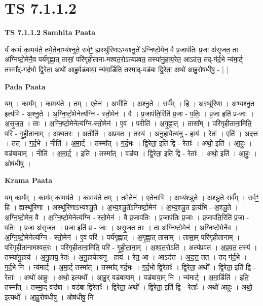 \documentclass[17pt]{extarticle}
\begin{document}
\section{ TS 7.1.1.2 }

\textbf{TS 7.1.1.2 } \newline
\textbf{Samhita Paata} \newline

र्यं कामं॑ का॒मय॑ते॒ तमे॒तेना॒भ्य॑श्नुते॒ सर्वꣳ॒॒ ह्यस्थु॑रिणाऽभ्यश्नु॒ते᳚ ऽग्निष्टो॒मेन॒ वै प्र॒जाप॑तिः प्र॒जा अ॑सृजत॒ ता अ॑ग्निष्टो॒मेनै॒व पर्य॑गृह्णा॒त् तासां॒ परि॑गृहीताना-मश्वत॒रोऽत्य॑प्रवत॒ तस्या॑नु॒हाय॒रेत॒ आऽद॑त्त॒ तद्-ग॑र्द॒भे न्य॑मा॒र्ट् तस्मा᳚द्-गर्द॒भो द्वि॒रेता॒ अथो॑ आहु॒र्वड॑बायां॒ न्य॑मा॒र्डिति॒ तस्मा॒द्-वड॑बा द्वि॒रेता॒ अथो॑ आहु॒रोष॑धीषु॒ - [  ] \newline

\textbf{Pada Paata} \newline

यम् । काम᳚म् । का॒मय॑ते । तम् । ए॒तेन॑ । अ॒भीति॑ । अ॒श्नु॒ते॒ । सर्व᳚म् । हि । अस्थू॑रिणा । अ॒भ्य॒श्नु॒त इत्य॑भि - अ॒श्नु॒ते । अ॒ग्नि॒ष्टो॒मेनेत्य॑ग्नि - स्तो॒मेन॑ । वै । प्र॒जाप॑ति॒रिति॑ प्र॒जा - प॒तिः॒ । प्र॒जा इति॑ प्र-जाः । अ॒सृ॒ज॒त॒ । ताः । अ॒ग्नि॒ष्टो॒मेनेत्य॑ग्नि-स्तो॒मेन॑ । ए॒व । परीति॑ । अ॒गृ॒ह्णा॒त् । तासा᳚म् । परि॑गृहीताना॒मिति॒ परि॑ - गृ॒ही॒ता॒ना॒म् । अ॒श्व॒त॒रः । अतीति॑ । अ॒प्र॒व॒त॒ । तस्य॑ । अ॒नु॒हायेत्य॑नु - हाय॑ । रेतः॑ । एति॑ । अ॒द॒त्त॒ । तत् । ग॒र्द॒भे । नीति॑ । अ॒मा॒र्ट् । तस्मा᳚त् । ग॒र्द॒भः । द्वि॒रेता॒ इति॑ द्वि - रेताः᳚ । अथो॒ इति॑ । आ॒हुः॒ । वड॑बायाम् । नीति॑ । अ॒मा॒र्ट्॒ । इति॑ । तस्मा᳚त् । वड॑बा । द्वि॒रेता॒ इति॑ द्वि - रेताः᳚ । अथो॒ इति॑ । आ॒हुः॒ । ओष॑धीषु ।  \newline


\textbf{Krama Paata} \newline

यम् काम᳚म् । काम॑म् का॒मय॑ते । का॒मय॑ते॒ तम् । तमे॒तेन॑ । ए॒तेना॒भि । अ॒भ्य॑श्ञुते । अ॒श्ञु॒ते॒ सर्व᳚म् । सर्वꣳ॒॒ हि । ह्यस्थू॑रिणा । अस्थू॑रिणाऽभ्यश्ञु॒ते । अ॒भ्य॒श्ञु॒ते᳚ऽग्निष्टो॒मेन॑ । अ॒भ्य॒श्ञु॒त इत्य॑भि - अ॒श्ञु॒ते । अ॒ग्नि॒ष्टो॒मेन॒ वै । अ॒ग्नि॒ष्टो॒मेनेत्य॑ग्नि - स्तो॒मेन॑ । वै प्र॒जाप॑तिः । प्र॒जाप॑तिः प्र॒जाः । प्र॒जाप॑ति॒रिति॑ प्र॒जा - प॒तिः॒ । प्र॒जा अ॑सृजत । प्र॒जा इति॑ प्र - जाः । अ॒सृ॒ज॒त॒ ताः । ता अ॑ग्निष्टो॒मेन॑ । अ॒ग्नि॒ष्टो॒मेनै॒व । अ॒ग्नि॒ष्टो॒मेनेत्य॑ग्नि - स्तो॒मेन॑ । ए॒व परि॑ । पर्य॑गृह्णात् । अ॒गृ॒ह्णा॒त् तासा᳚म् । तासा॒म् परि॑गृहीतानाम् । परि॑गृहीतानामश्वत॒रः । परि॑गृहीताना॒मिति॒ परि॑ - गृ॒ही॒ता॒ना॒म् । अ॒श्व॒त॒रोऽति॑ । अत्य॑प्रवत । अ॒प्र॒व॒त॒ तस्य॑ । तस्या॑नु॒हाय॑ । अ॒नु॒हाय॒ रेतः॑ । अ॒नु॒हायेत्य॑नु - हाय॑ । रेत॒ आ । आऽद॑त्त । अ॒द॒त्त॒ तत् । तद् ग॑र्द॒भे । ग॒र्द॒भे नि । न्य॑मार्ट् । अ॒मा॒र्ट् तस्मा᳚त् । तस्मा᳚द् गर्द॒भः । ग॒र्द॒भो द्वि॒रेताः᳚ । द्वि॒रेता॒ अथो᳚ । द्वि॒रेता॒ इति॑ द्वि - रेताः᳚ । अथो॑ आहुः । अथो॒ इत्यथो᳚ । आ॒हु॒र् वड॑बायाम् । वड॑बाया॒म् नि । न्य॑मार्ट् । अ॒मा॒र्डिति॑ । इति॒ तस्मा᳚त् । तस्मा॒द् वड॑बा । वड॑बा द्वि॒रेताः᳚ । द्वि॒रेता॒ अथो᳚ । द्वि॒रेता॒ इति॑ द्वि - रेताः᳚ । अथो॑ आहुः । अथो॒ इत्यथो᳚ । आ॒हु॒रोष॑धीषु । ओष॑धीषु॒ नि \newline
\end{document}
